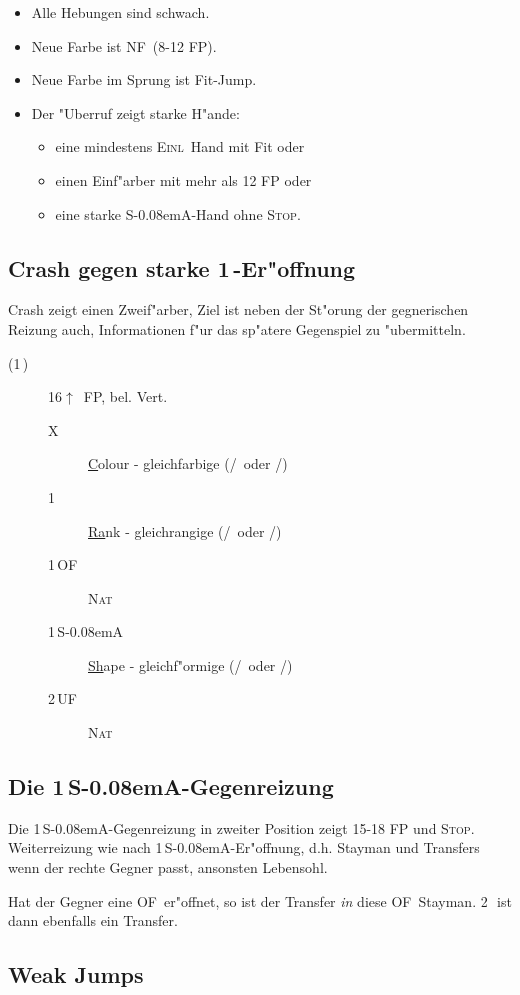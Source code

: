 \documentclass[11pt,german,twocolumn]{scrartcl}
\renewcommand{\Cl}{{\color{ClColor}{\clubs}}}
\renewcommand{\Di}{{\color{DiColor}{\sdiamonds}}}
\renewcommand{\He}{{\color{HeColor}{\shearts}}}
\renewcommand{\Sp}{{\color{SpColor}{\spades}}}
\def\kar{\,\Di}
\def\tre{\,\Cl}
\def\pi{\Sp}
\def\co{\He}
\def\ka{\Di}
\def\tr{\Cl}
\def\pl{$\uparrow$}
\def\uf{\textsf{\,UF}}
\def\of{\textsf{\,OF}}
\def\ofa{\textsf{OF}}
\def\sa{\textsf{S\kern-0.08emA}}
\def\SA{\,\sa}
\def\kontra{\textsf{X}}
\def\nat{\textsc{Nat}}
\def\inv{\textsc{Einl}}
\def\nf{\textsc{NF}}
\def\stp{\textsc{Stop}}
\def\bdsc{\begin{description}}
\def\edsc{\end{description}}
\begin{document}
\begin{itemize}
\item Alle Hebungen sind schwach.
\item Neue Farbe ist \nf\ (8-12 FP).
\item Neue Farbe im Sprung ist Fit-Jump.
\item Der "Uberruf zeigt starke H"ande:
  \begin{itemize}
  \item eine mindestens \inv\ Hand mit Fit oder
  \item einen Einf"arber mit mehr als 12 FP oder
  \item eine starke \sa-Hand ohne \stp.
  \end{itemize}
\end{itemize}

\subsection{Crash gegen starke 1\tre-Er"offnung}

Crash zeigt einen Zweif"arber, Ziel ist neben der St"orung der gegnerischen
Reizung auch, Informationen f"ur das sp"atere Gegenspiel zu "ubermitteln.

\bdsc
\item[(1\tre)] 16\pl\ FP, bel. Vert.
\bdsc
\item[\kontra] \underline{C}olour - gleichfarbige (\tr/\pi\ oder \ka/\co)
\item[1\kar] \underline{Ra}nk - gleichrangige (\tr/\ka\ oder \co/\pi)
\item[1\of] \nat
\item[1\SA] \underline{Sh}ape - gleichf"ormige (\tr/\co\ oder \ka/\pi)
\item[2\uf] \nat
\edsc
\edsc

\subsection{Die 1\SA-Gegenreizung}

Die 1\SA-Gegenreizung in zweiter Position zeigt 15-18 FP und \stp. Weiterreizung wie nach
1\SA-Er"offnung, d.h. Stayman und Transfers wenn der rechte Gegner passt,
ansonsten Lebensohl.

Hat der Gegner eine \ofa\ er"offnet, so ist der Transfer \emph{in} diese \ofa\
Stayman. 2\tre\ ist dann ebenfalls ein Transfer.

\subsection{Weak Jumps}
\end{document}

